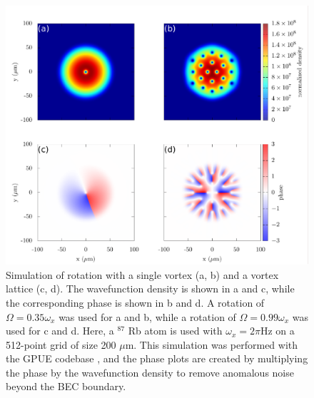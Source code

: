\begin{figure}

\includegraphics[width=\textwidth]{data/splitop/rot/WIP.pdf}

\caption{
Simulation of rotation with a single vortex (a, b) and a vortex lattice (c, d).
The wavefunction density is shown in a and c, while the corresponding phase is shown in b and d.
A rotation of $\Omega = 0.35\omega_x$ was used for a and b, while a rotation of $\Omega = 0.99\omega_x$ was used for c and d.
Here, a $^87$ Rb atom is used with $\omega_x = 2\pi$Hz on a 512-point grid of size 200 $\mu$m.
This simulation was performed with the GPUE codebase \cite{schloss2018}, and the phase plots are created by multiplying the phase by the wavefunction density to remove anomalous noise beyond the BEC boundary.
}
\label{fig:rot}
\end{figure}

